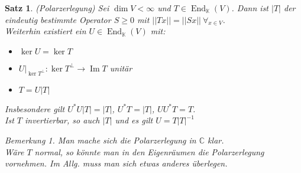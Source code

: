 \documentclass[12pt,a4paper]{article}
\newtheorem{theorem}{Satz}
\theoremstyle{definition}
\theoremstyle{remark}
\newtheorem*{remark}{Bemerkung}
\DeclareMathOperator{\Img}{Im}
\DeclareMathOperator{\End}{End}
\begin{document}
	\newpage
	\begin{theorem}{(Polarzerlegung)}
		Sei $\dim V < \infty$ und $T \in \End_{\mathbb{K}}(V)$. Dann ist $|T|$ der eindeutig bestimmte Operator $S \geq 0$ mit $||Tx||=||Sx|| \ \forall_{x \in V}$. \\
		Weiterhin existiert ein $U \in \End_{\mathbb{K}}(V)$ mit:
		\begin{itemize}
			\item $\ker U=\ker T$ 
			\item $U|_{\ker T^{\bot}}: \ker T^{\bot} \rightarrow \Img T$ unitär
			\item $T=U|T|$
		\end{itemize}
		Insbesondere gilt $U^*U|T|=|T|$, $U^*T=|T|$, $UU^*T=T$. \\
		Ist $T$ invertierbar, so auch $|T|$ und es gilt $U = T|T|^{-1}$
		\begin{remark}
			Man mache sich die Polarzerlegung in $\mathbb{C}$ klar. \\
			Wäre $T$ normal, so könnte man in den Eigenräumen die Polarzerlegung vornehmen. Im Allg. muss man sich etwas anderes überlegen.
		\end{remark}
	\end{theorem}
\end{document}
